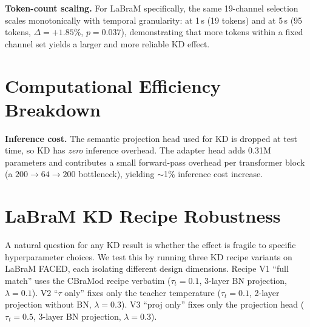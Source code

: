 \noindent\textbf{Token-count scaling.} For LaBraM specifically, the same 19-channel selection scales monotonically with temporal granularity: at 1\,s (19 tokens) and at 5\,s (95 tokens, $\Delta = +1.85\%$, $p = 0.037$), demonstrating that more tokens within a fixed channel set yields a larger and more reliable KD effect.

\section{Computational Efficiency Breakdown}
\label{sec:supp_efficiency}

\begin{table}[!h]
\caption{Detailed parameter breakdown for the three main configurations of \ours\ on FACED. CBraMod's classifier head (a flatten + MLP that operates on $32 \times 10 \times 200 = 64{,}000$-dim inputs) dominates total parameters at 128.4M. KD adds a small training-only semantic head; adapter freezes the 4.88M backbone.}
\small
\centering
{}
\label{tab:supp_efficiency}
\end{table}

\noindent\textbf{Inference cost.} The semantic projection head used for KD is dropped at test time, so KD has \emph{zero} inference overhead. The adapter head adds 0.31M parameters and contributes a small forward-pass overhead per transformer block (a $200 \to 64 \to 200$ bottleneck), yielding $\sim$1\% inference cost increase.

\section{LaBraM KD Recipe Robustness}
\label{sec:supp_labram_recipes}

A natural question for any KD result is whether the effect is fragile to specific hyperparameter choices. We test this by running three KD recipe variants on LaBraM FACED, each isolating different design dimensions. Recipe V1 ``full match'' uses the CBraMod recipe verbatim ($\tau_t = 0.1$, 3-layer BN projection, $\lambda = 0.1$). V2 ``$\tau$ only'' fixes only the teacher temperature ($\tau_t = 0.1$, 2-layer projection without BN, $\lambda = 0.3$). V3 ``proj only'' fixes only the projection head ($\tau_t = 0.5$, 3-layer BN projection, $\lambda = 0.3$).

